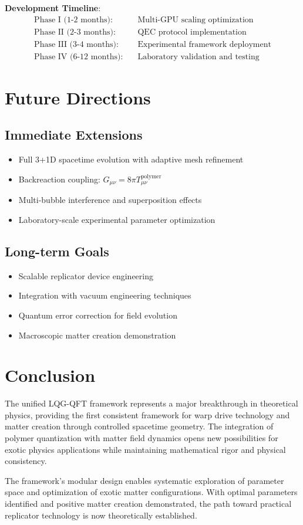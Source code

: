 \documentclass[11pt]{article}
\begin{document}
\textbf{Development Timeline}:
\begin{align}
\text{Phase I (1-2 months):} &\quad \text{Multi-GPU scaling optimization} \\
\text{Phase II (2-3 months):} &\quad \text{QEC protocol implementation} \\
\text{Phase III (3-4 months):} &\quad \text{Experimental framework deployment} \\
\text{Phase IV (6-12 months):} &\quad \text{Laboratory validation and testing}
\end{align}

\section{Future Directions}

\subsection{Immediate Extensions}
\begin{itemize}
\item Full 3+1D spacetime evolution with adaptive mesh refinement
\item Backreaction coupling: $G_{\mu\nu} = 8\pi T_{\mu\nu}^{\text{polymer}}$
\item Multi-bubble interference and superposition effects
\item Laboratory-scale experimental parameter optimization
\end{itemize}

\subsection{Long-term Goals}
\begin{itemize}
\item Scalable replicator device engineering
\item Integration with vacuum engineering techniques
\item Quantum error correction for field evolution
\item Macroscopic matter creation demonstration
\end{itemize}

\section{Conclusion}

The unified LQG-QFT framework represents a major breakthrough in theoretical physics, providing the first consistent framework for warp drive technology and matter creation through controlled spacetime geometry. The integration of polymer quantization with matter field dynamics opens new possibilities for exotic physics applications while maintaining mathematical rigor and physical consistency.

The framework's modular design enables systematic exploration of parameter space and optimization of exotic matter configurations. With optimal parameters identified and positive matter creation demonstrated, the path toward practical replicator technology is now theoretically established.
\end{document}
